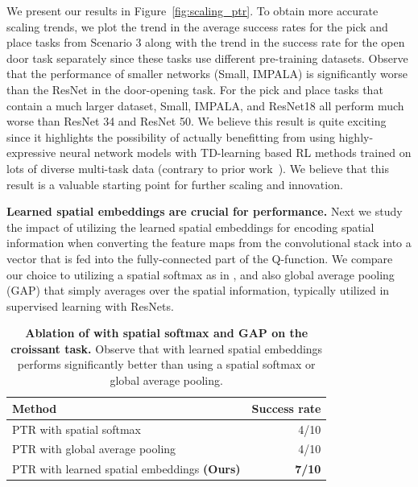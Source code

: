 \documentclass[conference]{IEEEtran}
\begin{document}
We present our results in {Figure~\ref{fig:scaling_ptr}}. To obtain more accurate scaling trends, we plot the trend in the average success rates for the pick and place tasks from Scenario 3 along with the trend in the success rate for the open door task separately since these tasks use different pre-training datasets. Observe that the performance of smaller networks (Small, IMPALA) is significantly worse than the ResNet in the door-opening task. For the pick and place tasks that contain a much larger dataset, Small, IMPALA, and ResNet18 all perform much worse than ResNet 34 and ResNet 50. We believe this result is quite exciting since it highlights the possibility of actually benefitting from using highly-expressive neural network models with TD-learning based RL methods trained on lots of diverse multi-task data (contrary to prior work~\citep{lee2022multi}). We believe that this result is a valuable starting point for further scaling and innovation.


\textbf{Learned spatial embeddings are crucial for performance.} Next we study the impact of utilizing the learned spatial embeddings for encoding spatial information when converting the feature maps from the convolutional stack into a vector that is fed into the fully-connected part of the Q-function. We compare our choice to utilizing a spatial softmax as in \citet{ebert2021bridge}, and also global average pooling (GAP) that simply averages over the spatial information, typically utilized in supervised learning with ResNets.


\begin{table}[h]
\centering
\begin{tabular}{l|r}
\toprule
\textbf{Method} & \textbf{Success rate}\\  \midrule
PTR with spatial softmax & 4/10 \\
PTR with global average pooling & 4/10 \\
\midrule
PTR with learned spatial embeddings \textbf{(Ours)} & \textbf{7/10} \\
\bottomrule
\end{tabular}
\vspace{0.1cm}
\caption{\footnotesize{\textbf{Ablation of \methodname with spatial softmax and GAP on the croissant task.} Observe that \methodname with learned spatial embeddings performs significantly better than using a spatial softmax or global average pooling.}}
\label{tab:spatial}
\end{table}
\end{document}
